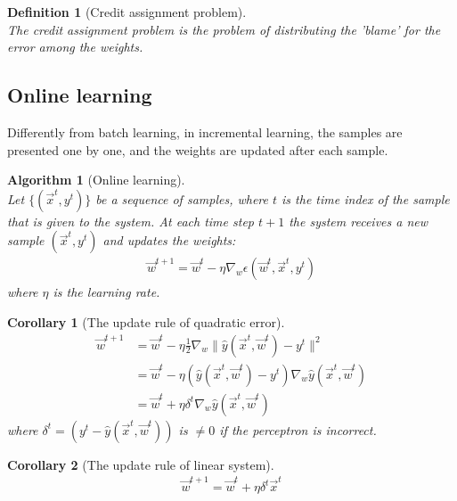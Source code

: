 \documentclass[11pt]{book} %
\newtheorem{definition}{Definition}[section]
\newtheorem{corollary}{Corollary}[section]
\newtheorem{algorithm}{Algorithm}[section]
\begin{document}
\begin{definition}[Credit assignment problem]\ \\
    The credit assignment problem is the problem of distributing the 'blame' for the error among the weights.
\end{definition}


\subsection{Online learning}

Differently from batch learning, in incremental learning, the samples are presented one by one, and the weights are updated after each sample.

\begin{algorithm}[Online learning]\ \\
    Let $\{ (\vec{x}^t, y^t) \}$ be a sequence of samples, where $t$ is the time index of the sample that is given to the system.
    At each time step $t+1$ the system receives a new sample $(\vec{x}^{t}, y^{t})$ and updates the weights: 
    \begin{align}
        \vec{w}^{t+1} = \vec{w}^{t} - \eta \nabla_w \epsilon(\vec{w}^{t}, \vec{x}^{t}, y^{t})
    \end{align}
    where $\eta$ is the learning rate.
\end{algorithm}

\begin{corollary}[The update rule of quadratic error]\ \\
    \begin{align*}
        \vec{w}^{t+1} &= \vec{w}^{t} - \eta \frac{1}{2} \nabla_w \lVert \hat{y}(\vec{x}^t, \vec{w}^t) - y^t \rVert^2  \\ 
        &= \vec{w}^{t} - \eta (\hat{y}(\vec{x}^t, \vec{w}^t) - y^t) \nabla_w \hat{y}(\vec{x}^t, \vec{w}^t) \\
        &= \vec{w}^{t} + \eta \delta^t \nabla_w \hat{y}(\vec{x}^t, \vec{w}^t)
    \end{align*}
    where $\delta^t = (y^t - \hat{y}(\vec{x}^t, \vec{w}^t))$ is $\neq 0$ if the perceptron is incorrect.
\end{corollary}

\begin{corollary}[The update rule of linear system]\ \\
    \begin{align}
        \vec{w}^{t+1} = \vec{w}^{t} + \eta \delta^t \vec{x}^t
    \end{align}
    

\end{corollary}
\end{document}
